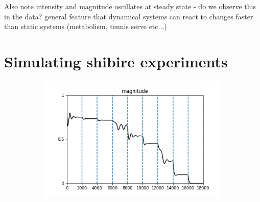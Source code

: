 \documentclass{article}
\begin{document}
Also note intensity and magnitude oscillates at steady state - do we observe this in the data? general feature that dynamical systems can react to changes faster than static systems (metabolism, tennis serve etc...)

\section{Simulating shibire experiments}

\begin{figure}[h]
	\centering
	\begin{subfigure}[t]{0.73\linewidth}
		\centering
		\includegraphics[width = 1.0\linewidth, trim={0 0 0 0}, clip=true]{../figures/D7_sequential_mags.png}
		\label{fig:F}	
	\end{subfigure}
	\hspace{0.1\linewidth}
\caption{}
\label{fig:fit}
\end{figure}
\end{document}
